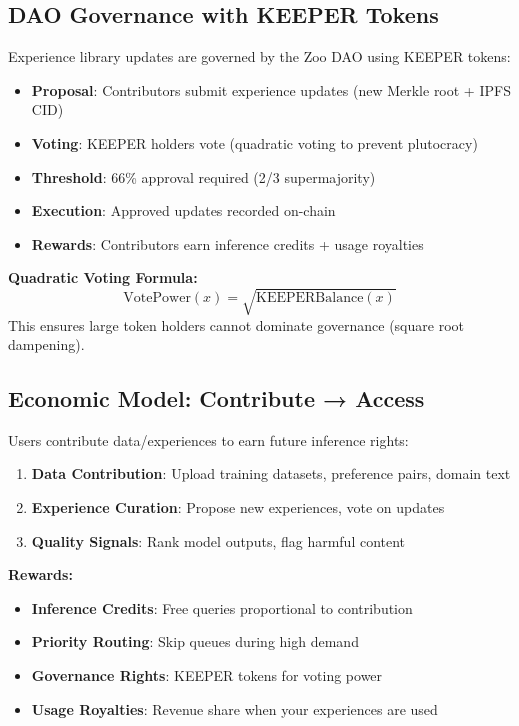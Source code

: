 \documentclass[11pt,a4paper]{article}
\begin{document}
\subsection{DAO Governance with KEEPER Tokens}

Experience library updates are governed by the Zoo DAO using KEEPER tokens:

\begin{itemize}
    \item \textbf{Proposal}: Contributors submit experience updates (new Merkle root + IPFS CID)
    \item \textbf{Voting}: KEEPER holders vote (quadratic voting to prevent plutocracy)
    \item \textbf{Threshold}: 66\% approval required (2/3 supermajority)
    \item \textbf{Execution}: Approved updates recorded on-chain
    \item \textbf{Rewards}: Contributors earn inference credits + usage royalties
\end{itemize}

\textbf{Quadratic Voting Formula:}
\begin{equation}
\text{VotePower}(x) = \sqrt{\text{KEEPERBalance}(x)}
\end{equation}
This ensures large token holders cannot dominate governance (square root dampening).

\subsection{Economic Model: Contribute → Access}

Users contribute data/experiences to earn future inference rights:

\begin{enumerate}
    \item \textbf{Data Contribution}: Upload training datasets, preference pairs, domain text
    \item \textbf{Experience Curation}: Propose new experiences, vote on updates
    \item \textbf{Quality Signals}: Rank model outputs, flag harmful content
\end{enumerate}

\textbf{Rewards:}
\begin{itemize}
    \item \textbf{Inference Credits}: Free queries proportional to contribution
    \item \textbf{Priority Routing}: Skip queues during high demand
    \item \textbf{Governance Rights}: KEEPER tokens for voting power
    \item \textbf{Usage Royalties}: Revenue share when your experiences are used
\end{itemize}
\end{document}
